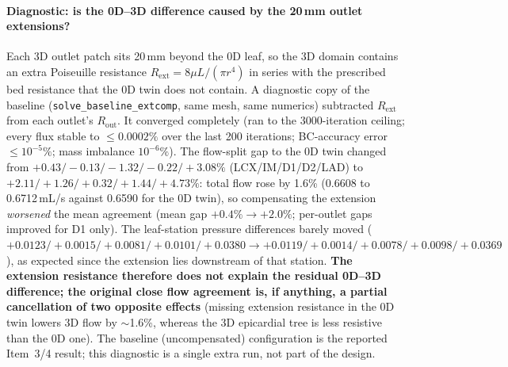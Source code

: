 \documentclass[11pt]{article}
\begin{document}
\paragraph{Diagnostic: is the 0D--3D difference caused by the 20\,mm outlet extensions?} Each 3D outlet patch sits
20\,mm beyond the 0D leaf, so the 3D domain contains an extra Poiseuille resistance
$R_\text{ext}=8\mu L/(\pi r^4)$ in series with the prescribed bed resistance that the 0D twin does not contain. A
diagnostic copy of the baseline (\texttt{solve\_\allowbreak{}baseline\_\allowbreak{}extcomp}, same mesh, same numerics) subtracted $R_\text{ext}$
from each outlet's $R_\text{out}$. It converged completely (ran to the 3000-iteration ceiling; every flux stable to
$\leq0.0002\%$ over the last 200 iterations; BC-accuracy error $\leq10^{-5}\%$; mass imbalance $10^{-6}\%$). The
flow-split gap to the 0D twin changed from $+0.43/-0.13/-1.32/-0.22/+3.08\%$ (LCX/IM/D1/D2/LAD) to
$+2.11/+1.26/+0.32/+1.44/+4.73\%$: total flow rose by 1.6\% (0.6608 to 0.6712\,mL/s against 0.6590 for the 0D twin),
so compensating the extension \emph{worsened} the mean agreement (mean gap $+0.4\%\to+2.0\%$; per-outlet gaps
improved for D1 only). The leaf-station pressure differences barely moved
($+0.0123/+0.0015/+0.0081/+0.0101/+0.0380\to+0.0119/+0.0014/+0.0078/+0.0098/+0.0369$), as expected since the extension
lies downstream of that station. \textbf{The extension resistance therefore does not explain the residual 0D--3D
difference; the original close flow agreement is, if anything, a partial cancellation of two opposite effects} (missing
extension resistance in the 0D twin lowers 3D flow by $\sim$1.6\%, whereas the 3D epicardial tree is less resistive than
the 0D one). The baseline (uncompensated) configuration is the reported Item~3/4 result; this diagnostic is a single
extra run, not part of the design.
\end{document}
